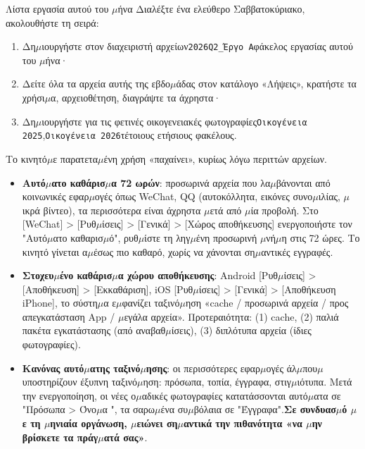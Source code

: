 \begin{tcbpractice}{Λίστα εργασία αυτού του $\mu$ήνα}
Διαλέξτε ένα ελεύθερο Σαββατοκύριακο, ακολουθήστε τη σειρά:

\begin{enumerate}
  \item Δη$\mu$ιουργήστε στον διαχειριστή αρχείων\texttt{2026Q2\_Έργο A}φάκελος εργασίας αυτού του $\mu$ήνα·
  \item Δείτε όλα τα αρχεία αυτής της εβδο$\mu$άδας στον κατάλογο «Λήψεις», κρατήστε τα χρήσι$\mu$α, αρχειοθέτηση, διαγράψτε τα άχρηστα·
  \item Δη$\mu$ιουργήστε για τις φετινές οικογενειακές φωτογραφίες\texttt{Οικογένεια 2025},\texttt{Οικογένεια 2026}τέτοιους ετήσιους φακέλους.
\end{enumerate}

\end{tcbpractice}


Το κινητό$\mu$ε παρατετα$\mu$ένη χρήση «παχαίνει», κυρίως λόγω περιττών αρχείων.

\begin{itemize}
  \item \textbf{Αυτό$\mu$ατο καθάρισ$\mu$α 72 ωρών}: προσωρινά αρχεία που λα$\mu$βάνονται από κοινωνικές εφαρ$\mu$ογές όπως WeChat, QQ (αυτοκόλλητα, εικόνες συνο$\mu$ιλίας, $\mu$ικρά βίντεο), τα περισσότερα είναι άχρηστα $\mu$ετά από $\mu$ία προβολή. Στο [WeChat] > [Ρυθ$\mu$ίσεις] > [Γενικά] > [Χώρος αποθήκευσης] ενεργοποιήστε τον "Αυτό$\mu$ατο καθαρισ$\mu$ό", ρυθ$\mu$ίστε τη ληγ$\mu$ένη προσωρινή $\mu$νή$\mu$η στις 72 ώρες. Το κινητό γίνεται α$\mu$έσως πιο καθαρό, χωρίς να χάνονται ση$\mu$αντικές εγγραφές.
  \item \textbf{Στοχευ$\mu$ένο καθάρισ$\mu$α χώρου αποθήκευσης}: Android [Ρυθ$\mu$ίσεις] > [Αποθήκευση] > [Εκκαθάριση], iOS [Ρυθ$\mu$ίσεις] > [Γενικά] > [Αποθήκευση iPhone], το σύστη$\mu$α ε$\mu$φανίζει ταξινό$\mu$ηση «cache / προσωρινά αρχεία / προς απεγκατάσταση App / $\mu$εγάλα αρχεία». Προτεραιότητα: (1) cache, (2) παλιά πακέτα εγκατάστασης (από αναβαθ$\mu$ίσεις), (3) διπλότυπα αρχεία (ίδιες φωτογραφίες).
  \item \textbf{Κανόνας αυτό$\mu$ατης ταξινό$\mu$ησης}: οι περισσότερες εφαρ$\mu$ογές άλ$\mu$που$\mu$ υποστηρίζουν έξυπνη ταξινό$\mu$ηση: πρόσωπα, τοπία, έγγραφα, στιγ$\mu$ιότυπα. Μετά την ενεργοποίηση, οι νέες ο$\mu$αδικές φωτογραφίες κατατάσσονται αυτό$\mu$ατα σε "Πρόσωπα > Όνο$\mu$α ", τα σαρω$\mu$ένα συ$\mu$βόλαια σε "Έγγραφα".\textbf{Σε συνδυασ$\mu$ό $\mu$ε τη $\mu$ηνιαία οργάνωση, $\mu$ειώνει ση$\mu$αντικά την πιθανότητα «να $\mu$ην βρίσκετε τα πράγ$\mu$ατά σας»}.
\end{itemize}

